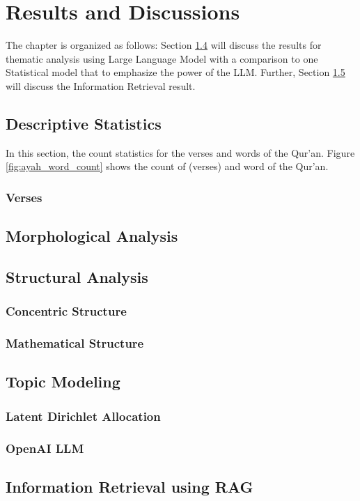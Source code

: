 \chapter{Results and Discussions}
The chapter is organized as follows: Section \ref{sec:topic_modeling_result} will discuss the results for thematic analysis using Large Language Model with a comparison to one Statistical model that to emphasize the power of the LLM. Further, 
Section \ref{sec:ir_result} will discuss the Information Retrieval result.
\section{Descriptive Statistics}\label{sec:ch4_desc_stat}
In this section, the count statistics for the verses and words of the Qur'an. Figure \ref{fig:ayah_word_count} shows the count of   (verses) and word of the Qur'an.
\subsection{Verses}\label{sec:ch4_desc_stat_verse}
\section{Morphological Analysis}
\section{Structural Analysis}
\subsection{Concentric Structure}
\subsection{Mathematical Structure}
\section{Topic Modeling}\label{sec:topic_modeling_result}
\subsection{Latent Dirichlet Allocation}
\subsection{OpenAI LLM}
\section{Information Retrieval using RAG}\label{sec:ir_result}


